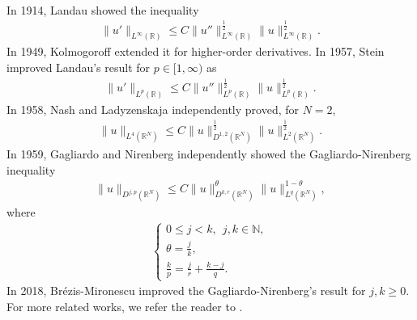 \documentclass[12pt,a4paper,reqno]{amsart}
\numberwithin{equation}{section}
\begin{document}
$~$\\
 In 1914, Landau \cite{Landau1914PLMS} showed the inequality
\begin{equation*}
\begin{aligned}
\|u'\|_{L^{\infty}(\mathbb{R})}
\leqslant
C
\|u''\|_{L^{\infty}(\mathbb{R})}^{\frac{1}{2}}
\|u\|_{L^{\infty}(\mathbb{R})}^{\frac{1}{2}}.
\end{aligned}
\end{equation*}
In 1949, Kolmogoroff
\cite{Kolmogoroff1949} extended it for higher-order derivatives.
In 1957, Stein
\cite{Stein1957Annals}
improved Landau's result  for $p\in[1,\infty)$ as
\begin{equation*}
\begin{aligned}
\|u'\|_{L^{p}(\mathbb{R})}
\leqslant
C
\|u''\|_{L^{p}(\mathbb{R})}^{\frac{1}{2}}
\|u\|_{L^{p}(\mathbb{R})}^{\frac{1}{2}}.
\end{aligned}
\end{equation*}
In 1958, Nash \cite{Nash1958AJM} and Ladyzenskaja \cite{Ladyzenskaja1958} independently proved, for $N=2$,
\begin{equation*}
\begin{aligned}
\|u\|_{L^{4}(\mathbb{R}^{N})}
\leqslant
C
\|u\|_{D^{1,2}(\mathbb{R}^{N})}^{\frac{1}{2}}
\|u\|_{L^{2}(\mathbb{R}^{N})}^{\frac{1}{2}}.
\end{aligned}
\end{equation*}
In 1959, Gagliardo \cite{Gagliardo1959RDM} and Nirenberg \cite{Nirenberg1959Pisa} independently showed the Gagliardo-Nirenberg inequality
\begin{equation*}
\begin{aligned}
\|u\|_{D^{j,p}(\mathbb{R}^{N})}
\leqslant
C
\|u\|_{D^{k,r}(\mathbb{R}^{N})}^{\theta}
\|u\|_{L^{q}(\mathbb{R}^{N})}^{1-\theta},
\end{aligned}
\end{equation*}
where
\begin{equation*}
\begin{aligned}
\begin{cases}
0\leqslant j<k,~~j,k\in \mathbb{N},\\
\theta=\frac{j}{k},\\
\frac{k}{p}=\frac{j}{r}+\frac{k-j}{q}.
\end{cases}
\end{aligned}
\end{equation*}
In 2018, Brézis-Mironescu \cite{Brezis-Mironescu2018Poincare} improved the Gagliardo-Nirenberg's result for $j,k\geqslant0$.
For more related works, we refer the reader to
\cite{Brezis-Mironescu2019JFA,Fila-Winkler2019AM,DelPino-Dolbeault2002JMPA,CorderoErausquin-Nazaret-Villani2004AM,Agueh2008NODEA,Hajaiej-Molinet-Ozawa-Wang2011}.
\end{document}
